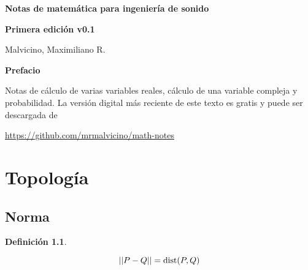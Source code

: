 \documentclass[a5paper,12pt,twoside]{book}
\newtheorem{defn}{{Definición}}[chapter]
\begin{document}
\pagestyle{fancy}
\fancyhf{}
\chead{\scriptsize \nouppercase\rightmark}
\cfoot{\scriptsize \thepage}
\renewcommand{\headrulewidth}{0pt}

\frontmatter
%

\begin{center}

    \begin{Huge}
    \textbf{Notas de matemática para ingeniería de sonido}
    \end{Huge}

    \vspace{1cm}
    \textbf{Primera edición v0.1}
    \vspace{2cm}

    \begin{Large}
        Malvicino, Maximiliano R.
    \end{Large}

\end{center}

\clearpage
\noindent
\textbf{Prefacio}

Notas de cálculo de varias variables reales, cálculo de una variable compleja y probabilidad.
La versión digital más reciente de este texto es gratis y puede ser descargada de
\begin{center}
    \small
    \url{https://github.com/mrmalvicino/math-notes}
\end{center}

\renewcommand{\spanishappendixname}{Anexo}
\tableofcontents

\mainmatter
{}


\chapter{Topología}


\section{Norma}

\begin{mdframed}[style=MyFrame1]
    \begin{defn}
    \end{defn}
    \begin{equation*}
        {\left|\left| {P-Q} \right|\right|} = \operatorname{dist} (P,Q)
    \end{equation*}
\end{mdframed}
\end{document}
